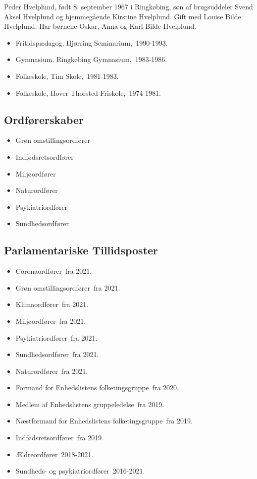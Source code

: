 \documentclass[11pt, a4paper]{awesome-cv}
\begin{document}
\makecvheader[R]
\makelettertitle
\begin{cvletter}
Peder Hvelplund, født 8. september 1967 i Ringkøbing, søn af brugsuddeler Svend Aksel Hvelplund og hjemmegående Kirstine Hvelplund. Gift med Louise Bilde Hvelplund. Har børnene Oskar, Anna og Karl Bilde Hvelplund. 

\begin{itemize}
\item Fritidspædagog, Hjørring Seminarium, 1990-1993.
\item Gymnasium, Ringkøbing Gymnasium, 1983-1986.
\item Folkeskole, Tim Skole, 1981-1983.
\item Folkeskole, Hover-Thorsted Friskole, 1974-1981.
\end{itemize}
\subsection*{Ordførerskaber}
\begin{itemize}
\item Grøn omstillingsordfører
\item Indfødsretsordfører
\item Miljøordfører
\item Naturordfører
\item Psykiatriordfører
\item Sundhedsordfører
\end{itemize}
\subsection*{Parlamentariske Tillidsposter}
\begin{itemize}
\item Coronaordfører fra 2021.
\item Grøn omstillingsordfører fra 2021.
\item Klimaordfører fra 2021.
\item Miljøordfører fra 2021.
\item Psykiatriordfører fra 2021.
\item Sundhedsordfører fra 2021.
\item Naturordfører fra 2021.
\item Formand for Enhedslistens folketingsgruppe fra 2020.
\item Medlem af Enhedslistens gruppeledelse fra 2019.
\item Næstformand for Enhedslistens folketingsgruppe fra 2019.
\item Indfødsretsordfører fra 2019.
\item Ældreordfører 2018-2021.
\item Sundheds- og psykiatriordfører 2016-2021.
\end{itemize}

\end{cvletter}
\end{document}
